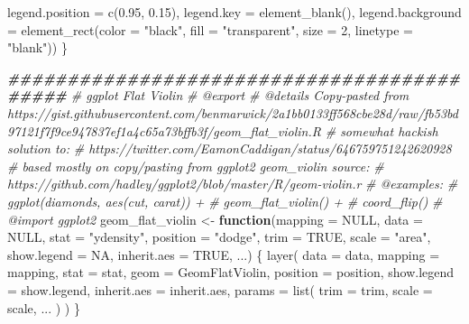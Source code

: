 \documentclass[a4paper,nobind]{templates/ociamthesis}
\newenvironment{Shaded}{\begin{snugshade}}{\end{snugshade}}
\newcommand{\AttributeTok}[1]{\textcolor[rgb]{0.77,0.63,0.00}{#1}}
\newcommand{\CommentTok}[1]{\textcolor[rgb]{0.56,0.35,0.01}{\textit{#1}}}
\newcommand{\ConstantTok}[1]{\textcolor[rgb]{0.00,0.00,0.00}{#1}}
\newcommand{\ControlFlowTok}[1]{\textcolor[rgb]{0.13,0.29,0.53}{\textbf{#1}}}
\newcommand{\DecValTok}[1]{\textcolor[rgb]{0.00,0.00,0.81}{#1}}
\newcommand{\DocumentationTok}[1]{\textcolor[rgb]{0.56,0.35,0.01}{\textbf{\textit{#1}}}}
\newcommand{\FloatTok}[1]{\textcolor[rgb]{0.00,0.00,0.81}{#1}}
\newcommand{\FunctionTok}[1]{\textcolor[rgb]{0.00,0.00,0.00}{#1}}
\newcommand{\NormalTok}[1]{#1}
\newcommand{\OtherTok}[1]{\textcolor[rgb]{0.56,0.35,0.01}{#1}}
\newcommand{\StringTok}[1]{\textcolor[rgb]{0.31,0.60,0.02}{#1}}
\renewenvironment{Shaded}
{
  \vspace{10pt}%
  \begin{snugshade}%
}{%
  \end{snugshade}%
  \vspace{8pt}%
}
\begin{document}
\begin{Shaded}
\begin{Highlighting}[]
          \AttributeTok{legend.position =} \FunctionTok{c}\NormalTok{(}\FloatTok{0.95}\NormalTok{, }\FloatTok{0.15}\NormalTok{), }
          \AttributeTok{legend.key =} \FunctionTok{element\_blank}\NormalTok{(),}
          \AttributeTok{legend.background =} \FunctionTok{element\_rect}\NormalTok{(}\AttributeTok{color =} \StringTok{"black"}\NormalTok{, }
                                           \AttributeTok{fill =} \StringTok{"transparent"}\NormalTok{, }
                                           \AttributeTok{size =} \DecValTok{2}\NormalTok{, }\AttributeTok{linetype =} \StringTok{"blank"}\NormalTok{))}
\NormalTok{\}}
\end{Highlighting}
\end{Shaded}

\begin{Shaded}
\begin{Highlighting}[]
\DocumentationTok{\#\#\#\#\#\#\#\#\#\#\#\#\#\#\#\#\#\#\#\#\#\#\#\#\#\#\#\#\#\#\#\#\#\#\#\#\#\#\#\#\#\#\#}
\CommentTok{\#\textquotesingle{} ggplot Flat Violin}
\CommentTok{\#\textquotesingle{} @export}
\CommentTok{\#\textquotesingle{} @details Copy{-}pasted from https://gist.githubusercontent.com/benmarwick/2a1bb0133ff568cbe28d/raw/fb53bd97121f7f9ce947837ef1a4c65a73bffb3f/geom\_flat\_violin.R}
\CommentTok{\#\textquotesingle{} somewhat hackish solution to:}
\CommentTok{\#\textquotesingle{} https://twitter.com/EamonCaddigan/status/646759751242620928}
\CommentTok{\#\textquotesingle{} based mostly on copy/pasting from ggplot2 geom\_violin source:}
\CommentTok{\#\textquotesingle{} https://github.com/hadley/ggplot2/blob/master/R/geom{-}violin.r}
\CommentTok{\#\textquotesingle{} @examples:}
\CommentTok{\#\textquotesingle{} ggplot(diamonds, aes(cut, carat)) +}
\CommentTok{\#\textquotesingle{}   geom\_flat\_violin() +}
\CommentTok{\#\textquotesingle{}   coord\_flip()}
\CommentTok{\#\textquotesingle{} @import ggplot2}
\NormalTok{geom\_flat\_violin }\OtherTok{\textless{}{-}} \ControlFlowTok{function}\NormalTok{(}\AttributeTok{mapping =} \ConstantTok{NULL}\NormalTok{, }\AttributeTok{data =} \ConstantTok{NULL}\NormalTok{, }\AttributeTok{stat =} \StringTok{"ydensity"}\NormalTok{,}
                             \AttributeTok{position =} \StringTok{"dodge"}\NormalTok{, }\AttributeTok{trim =} \ConstantTok{TRUE}\NormalTok{, }\AttributeTok{scale =} \StringTok{"area"}\NormalTok{,}
                             \AttributeTok{show.legend =} \ConstantTok{NA}\NormalTok{, }\AttributeTok{inherit.aes =} \ConstantTok{TRUE}\NormalTok{, ...) \{}
  \FunctionTok{layer}\NormalTok{(}
    \AttributeTok{data =}\NormalTok{ data,}
    \AttributeTok{mapping =}\NormalTok{ mapping,}
    \AttributeTok{stat =}\NormalTok{ stat,}
    \AttributeTok{geom =}\NormalTok{ GeomFlatViolin,}
    \AttributeTok{position =}\NormalTok{ position,}
    \AttributeTok{show.legend =}\NormalTok{ show.legend,}
    \AttributeTok{inherit.aes =}\NormalTok{ inherit.aes,}
    \AttributeTok{params =} \FunctionTok{list}\NormalTok{(}
      \AttributeTok{trim =}\NormalTok{ trim,}
      \AttributeTok{scale =}\NormalTok{ scale,}
\NormalTok{      ...}
\NormalTok{    )}
\NormalTok{  )}
\NormalTok{\}}


\end{Highlighting}
\end{Shaded}
\end{document}
